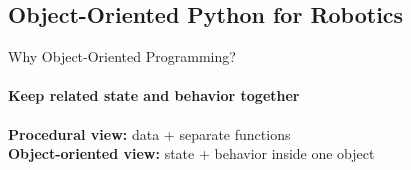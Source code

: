 

\subsection{Object-Oriented Python for Robotics}

\begin{frame}{Why Object-Oriented Programming?}
\framesubtitle{Keep related state and behavior together}
\begin{center}
\textbf{Procedural view:} data + separate functions\\[0.4em]
\textbf{Object-oriented view:} state + behavior inside one object
\end{center}
\end{frame}

